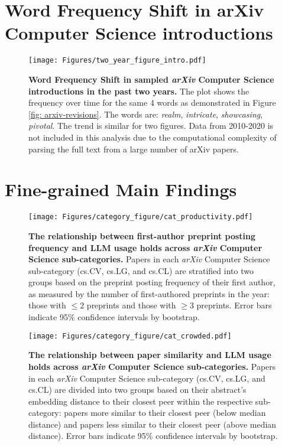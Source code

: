 \documentclass{article}
\begin{document}
\section{Word Frequency Shift in arXiv Computer Science introductions}
\begin{figure}[ht!]
    \centering
    \texttt{[image: Figures/two\_year\_figure\_intro.pdf]}
\caption{
    \textbf{Word Frequency Shift in sampled \textit{arXiv} Computer Science introductions in the past two years.} 
The plot shows the frequency over time for the same 4 words as demonstrated in Figure \ref{fig: arxiv-revisions}. The words are: \textit{realm}, \textit{intricate}, \textit{showcasing}, \textit{pivotal}. 
The trend is similar for two figures.
Data from 2010-2020 is not included in this analysis due to the computational complexity of parsing the full text from a large number of arXiv papers.
}
\end{figure}

\clearpage
\newpage




\section{Fine-grained Main Findings}


\begin{figure}[htb!] 
    \centering
    \texttt{[image: Figures/category\_figure/cat\_productivity.pdf]}
    \caption{    
\textbf{The relationship between first-author preprint posting frequency and LLM usage holds across \textit{arXiv} Computer Science sub-categories.}
Papers in each \textit{arXiv} Computer Science sub-category (cs.CV, cs.LG, and cs.CL) are stratified into two groups based on the preprint posting frequency of their first author, as measured by the number of first-authored preprints in the year: those with $\leq 2$ preprints and those with $\geq 3$ preprints. 
Error bars indicate 95\% confidence intervals by bootstrap.
    }
    \label{supp:figure:upload}
\end{figure}

\begin{figure}[htb!] 
    \centering
    \texttt{[image: Figures/category\_figure/cat\_crowded.pdf]}
    \caption{    
\textbf{The relationship between paper similarity and LLM usage holds across \textit{arXiv} Computer Science sub-categories.}
Papers in each \textit{arXiv} Computer Science sub-category (cs.CV, cs.LG, and cs.CL) are divided into two groups based on their abstract's embedding distance to their closest peer within the respective sub-category: papers more similar to their closest peer (below median distance) and papers less similar to their closest peer (above median distance). 
Error bars indicate 95\% confidence intervals by bootstrap.
    }
    \label{supp:figure:crowded}
\end{figure}
\end{document}
